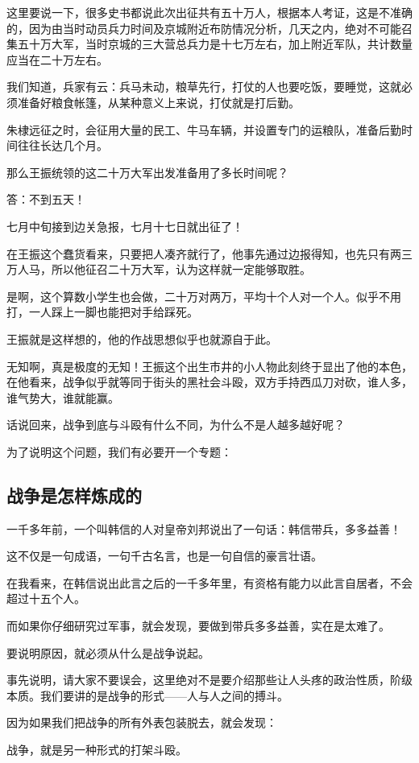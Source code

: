 \begin{multicols}{\theparacolNo}
这里要说一下，很多史书都说此次出征共有五十万人，根据本人考证，这是不准确的，因为由当时动员兵力时间及京城附近布防情况分析，几天之内，绝对不可能召集五十万大军，当时京城的三大营总兵力是十七万左右，加上附近军队，共计数量应当在二十万左右。

我们知道，兵家有云：兵马未动，粮草先行，打仗的人也要吃饭，要睡觉，这就必须准备好粮食帐篷，从某种意义上来说，打仗就是打后勤。

朱棣远征之时，会征用大量的民工、牛马车辆，并设置专门的运粮队，准备后勤时间往往长达几个月。

那么王振统领的这二十万大军出发准备用了多长时间呢？

答：不到五天！

七月中旬接到边关急报，七月十七日就出征了！

在王振这个蠢货看来，只要把人凑齐就行了，他事先通过边报得知，也先只有两三万人马，所以他征召二十万大军，认为这样就一定能够取胜。

是啊，这个算数小学生也会做，二十万对两万，平均十个人对一个人。似乎不用打，一人踩上一脚也能把对手给踩死。

王振就是这样想的，他的作战思想似乎也就源自于此。

无知啊，真是极度的无知！王振这个出生市井的小人物此刻终于显出了他的本色，在他看来，战争似乎就等同于街头的黑社会斗殴，双方手持西瓜刀对砍，谁人多，谁气势大，谁就能赢。

话说回来，战争到底与斗殴有什么不同，为什么不是人越多越好呢？

为了说明这个问题，我们有必要开一个专题：

\subsection{战争是怎样炼成的}
一千多年前，一个叫韩信的人对皇帝刘邦说出了一句话：韩信带兵，多多益善！

这不仅是一句成语，一句千古名言，也是一句自信的豪言壮语。

在我看来，在韩信说出此言之后的一千多年里，有资格有能力以此言自居者，不会超过十五个人。

而如果你仔细研究过军事，就会发现，要做到带兵多多益善，实在是太难了。

要说明原因，就必须从什么是战争说起。

事先说明，请大家不要误会，这里绝对不是要介绍那些让人头疼的政治性质，阶级本质。我们要讲的是战争的形式——人与人之间的搏斗。

因为如果我们把战争的所有外表包装脱去，就会发现：

战争，就是另一种形式的打架斗殴。


\end{multicols}
